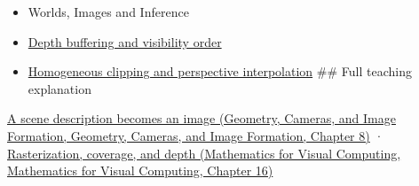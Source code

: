 \begin{itemize}
\item
  {Worlds, Images and Inference}
\item
  \hyperref[appendix-97578ed97952]{Depth buffering and visibility order}
\item
  \hyperref[appendix-40426e4b2103]{Homogeneous clipping and perspective interpolation} \#\# Full teaching explanation
\end{itemize}

\href{../03-Geometry-Cameras-and-Image-Formation/main.pdf\#nameddest=03-visual-computing-i-ch001-a-scene-description-becomes-an-image}{A scene description becomes an image (Geometry, Cameras, and Image Formation, Geometry, Cameras, and Image Formation, Chapter 8)} · \href{../02-Mathematics-for-Visual-Computing/main.pdf\#nameddest=03-visual-computing-i-ch012-rasterization-coverage-and-depth}{Rasterization, coverage, and depth (Mathematics for Visual Computing, Mathematics for Visual Computing, Chapter 16)}
